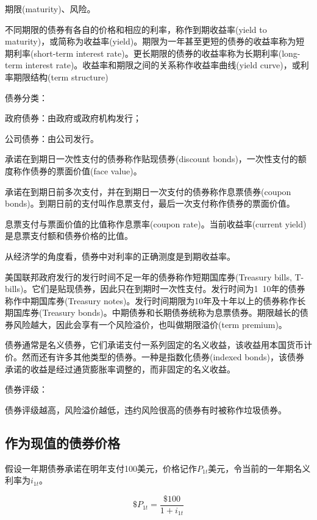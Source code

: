 \documentclass{article}
\begin{document}
期限(maturity)、风险。

不同期限的债券有各自的价格和相应的利率，称作到期收益率(yield to maturity)，或简称为收益率(yield)。期限为一年甚至更短的债券的收益率称为短期利率(short-term interest rate)。更长期限的债券的收益率称为长期利率(long-term interest rate)。收益率和期限之间的关系称作收益率曲线(yield curve)，或利率期限结构(term structure)

\hspace*{\fill}

债券分类：

政府债券：由政府或政府机构发行；

公司债券：由公司发行。

承诺在到期日一次性支付的债券称作贴现债券(discount bonds)，一次性支付的额度称作债券的票面价值(face value)。

承诺在到期日前多次支付，并在到期日一次支付的债券称作息票债券(coupon bonds)。到期日前的支付叫作息票支付，最后一次支付称作债券的票面价值。

息票支付与票面价值的比值称作息票率(coupon rate)。当前收益率(current yield)是息票支付额和债券价格的比值。

从经济学的角度看，债券中对利率的正确测度是到期收益率。

美国联邦政府发行的发行时间不足一年的债券称作短期国库券(Treasury bills, T-bills)。它们是贴现债券，因此只在到期时一次性支付。发行时间为1~10年的债券称作中期国库券(Treasury notes)。发行时间期限为10年及十年以上的债券称作长期国库券(Treasury bonds)。中期债券和长期债券统称为息票债券。期限越长的债券风险越大，因此会享有一个风险溢价，也叫做期限溢价(term premium)。

债券通常是名义债券，它们承诺支付一系列固定的名义收益，该收益用本国货币计价。然而还有许多其他类型的债券。一种是指数化债券(indexed bonds)，该债券承诺的收益是经过通货膨胀率调整的，而非固定的名义收益。


\hspace*{\fill}

债券评级：

债券评级越高，风险溢价越低，违约风险很高的债券有时被称作垃圾债券。

\subsection{作为现值的债券价格}

假设一年期债券承诺在明年支付100美元，价格记作$ P_{1t} $美元，令当前的一年期名义利率为$ i_{1t} $。

\[
\$P_{1t}=\frac{\$100}{1+i_{1t}}
\]
\end{document}
